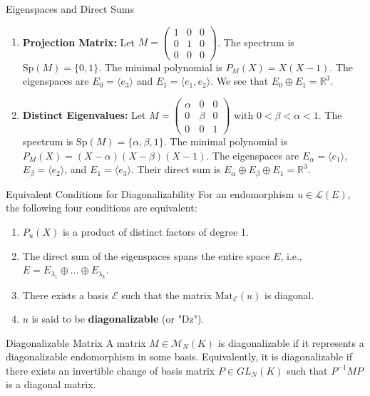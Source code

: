 \documentclass[11pt, a4paper]{article}
\newcommand{\R}{\mathbb{R}}
\begin{document}
\begin{example}{Eigenspaces and Direct Sums}{}
\begin{enumerate}
    \item \textbf{Projection Matrix:} Let $M = \begin{pmatrix} 1 & 0 & 0 \\ 0 & 1 & 0 \\ 0 & 0 & 0 \end{pmatrix}$. 
    The spectrum is $\text{Sp}(M) = \{0, 1\}$. 
    The minimal polynomial is $P_M(X) = X(X-1)$. 
    The eigenspaces are $E_0 = \langle e_3 \rangle$ and $E_1 = \langle e_1, e_2 \rangle$. 
    We see that $E_0 \oplus E_1 = \R^3$. 
    
    \item \textbf{Distinct Eigenvalues:} Let $M = \begin{pmatrix} \alpha & 0 & 0 \\ 0 & \beta & 0 \\ 0 & 0 & 1 \end{pmatrix}$ with $0 < \beta < \alpha < 1$. 
    The spectrum is $\text{Sp}(M) = \{\alpha, \beta, 1\}$. 
    The minimal polynomial is $P_M(X) = (X-\alpha)(X-\beta)(X-1)$. 
    The eigenspaces are $E_\alpha = \langle e_1 \rangle$, $E_\beta = \langle e_2 \rangle$, and $E_1 = \langle e_3 \rangle$. 
    Their direct sum is $E_\alpha \oplus E_\beta \oplus E_1 = \R^3$. 
\end{enumerate}
\end{example}

\begin{theorem}{Equivalent Conditions for Diagonalizability}{}
For an endomorphism $u \in \mathcal{L}(E)$, the following four conditions are equivalent:
\begin{enumerate}
    \item $P_u(X)$ is a product of distinct factors of degree 1. 
    \item The direct sum of the eigenspaces spans the entire space $E$, i.e., $E = E_{\lambda_1} \oplus \dots \oplus E_{\lambda_k}$. 
    \item There exists a basis $\mathcal{E}$ such that the matrix $\text{Mat}_{\mathcal{E}}(u)$ is diagonal. 
    \item $u$ is said to be \textbf{diagonalizable} (or "Dz"). 
\end{enumerate}
\end{theorem}

\begin{definition}{Diagonalizable Matrix}{}
A matrix $M \in \mathcal{M}_N(K)$ is diagonalizable if it represents a diagonalizable endomorphism in some basis. 
Equivalently, it is diagonalizable if there exists an invertible change of basis matrix $P \in GL_N(K)$ such that $P^{-1} M P$ is a diagonal matrix. 
\end{definition}
\end{document}
